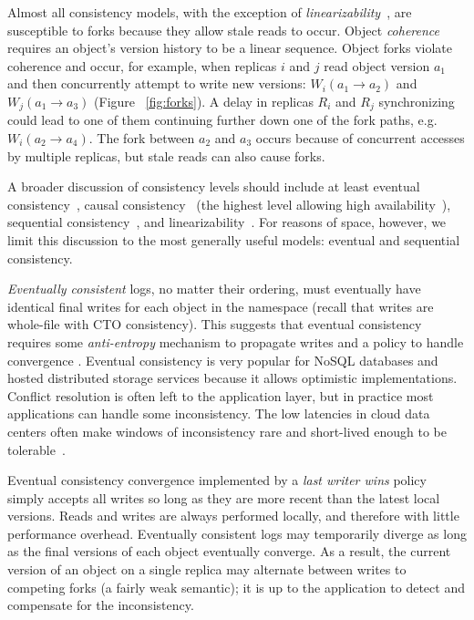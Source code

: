 \documentclass[10pt,conference,letterpaper]{IEEEtran}
\begin{document}
Almost all consistency models, with the exception of
\textit{linearizability}~\cite{herlihy_linearizability:_1990}, are susceptible to forks
because they allow stale reads to occur.
Object \emph{coherence} requires an object's version history to be a linear sequence.
Object forks violate coherence and occur, for example, when replicas $i$ and $j$ read object version $a_1$
and then concurrently attempt to write new versions: $W_i(a_1 \rightarrow a_2)$ and
$W_j(a_1 \rightarrow a_3)$ (Figure ~\ref{fig:forks}). 
A delay in replicas $R_i$ and $R_j$ synchronizing could lead to one of them continuing
further down one of the fork paths, e.g. $W_i(a_2 \rightarrow a_4)$.
The fork between $a_2$ and $a_3$ occurs because of concurrent accesses by multiple
replicas, but stale reads can also cause forks. 

A broader discussion of consistency levels should include at least eventual consistency~\cite{terry_managing_1995},
causal consistency~\cite{causal} (the highest level allowing high availability~\cite{bailis_bolt-causal_2013}),
sequential consistency~\cite{sequential-consistency}, and linearizability~\cite{herlihy_linearizability:_1990}.
For reasons of space, however, we limit this discussion to the most generally useful models:
eventual and sequential consistency.

\emph{Eventually consistent} logs, no matter their ordering, must eventually have identical final
writes for each object in the namespace (recall that writes are whole-file with CTO consistency).
This suggests that eventual consistency requires some \textit{anti-entropy} mechanism to
propagate writes and a policy to handle convergence \cite{terry_managing_1995}.
Eventual consistency is very popular for NoSQL databases and hosted distributed storage
services \cite{decandia_dynamo:_2007,lakshman_cassandra:_2010} because it allows
optimistic implementations.
Conflict resolution is often left to the application layer, but
in practice most applications can handle some inconsistency.
The low latencies in cloud data centers often make windows of 
inconsistency rare and 
short-lived enough to be tolerable~\cite{bailis_quantifying_2014}.

Eventual consistency convergence implemented by a \textit{last writer wins} policy simply accepts all
writes so long as they are more recent than the latest local versions.
Reads and writes are always performed locally, and therefore with little
performance overhead.
Eventually consistent logs may temporarily diverge as long as the final versions of each
object eventually converge.
As a result, the current version of an object on a single replica may alternate between writes to competing
forks (a fairly weak semantic); it is up to the application to detect and compensate for the
inconsistency.
\end{document}

